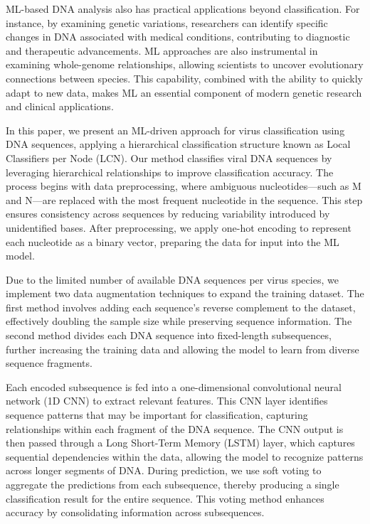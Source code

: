 ML-based DNA analysis also has practical applications beyond classification. For instance, by examining genetic variations, researchers can identify specific changes in DNA associated with medical conditions, contributing to diagnostic and therapeutic advancements. ML approaches are also instrumental in examining whole-genome relationships, allowing scientists to uncover evolutionary connections between species. This capability, combined with the ability to quickly adapt to new data, makes ML an essential component of modern genetic research and clinical applications.

In this paper, we present an ML-driven approach for virus classification using DNA sequences, applying a hierarchical classification structure known as Local Classifiers per Node (LCN). Our method classifies viral DNA sequences by leveraging hierarchical relationships to improve classification accuracy. The process begins with data preprocessing, where ambiguous nucleotides—such as M and N—are replaced with the most frequent nucleotide in the sequence. This step ensures consistency across sequences by reducing variability introduced by unidentified bases. After preprocessing, we apply one-hot encoding to represent each nucleotide as a binary vector, preparing the data for input into the ML model.

Due to the limited number of available DNA sequences per virus species, we implement two data augmentation techniques to expand the training dataset. The first method involves adding each sequence's reverse complement to the dataset, effectively doubling the sample size while preserving sequence information. The second method divides each DNA sequence into fixed-length subsequences, further increasing the training data and allowing the model to learn from diverse sequence fragments.

Each encoded subsequence is fed into a one-dimensional convolutional neural network (1D CNN) to extract relevant features. This CNN layer identifies sequence patterns that may be important for classification, capturing relationships within each fragment of the DNA sequence. The CNN output is then passed through a Long Short-Term Memory (LSTM) layer, which captures sequential dependencies within the data, allowing the model to recognize patterns across longer segments of DNA. During prediction, we use soft voting to aggregate the predictions from each subsequence, thereby producing a single classification result for the entire sequence. This voting method enhances accuracy by consolidating information across subsequences.

